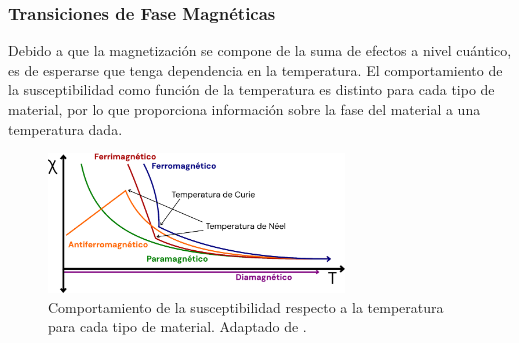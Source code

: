 \documentclass[../main.tex]{subfiles}
\begin{document}
\subsubsection{Transiciones de Fase Magnéticas} \label{sec:magtemp}
Debido a que la magnetización se compone de la suma de efectos a nivel cuántico, es de esperarse que tenga dependencia en la temperatura. El comportamiento de la susceptibilidad como función de la temperatura es distinto para cada tipo de material, por lo que proporciona información sobre la fase del material a una temperatura dada.
\begin{figure}[H]
    \centering
    \includegraphics[width=0.7\textwidth]{fig/chitemp.png}
    \caption{Comportamiento de la susceptibilidad respecto a la temperatura para cada tipo de material. Adaptado de \cite{Ohl2021}.}
    \label{fig:chitemp}
\end{figure}
\end{document}
